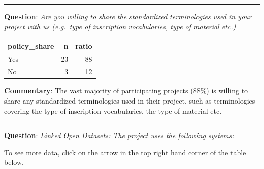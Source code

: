 \documentclass[
  12pt,
]{scrreprt}
\begin{document}
\begin{center}\rule{0.5\linewidth}{0.5pt}\end{center}

\textbf{Question}: \emph{Are you willing to share the standardized
terminologies used in your project with us (e.g.~type of inscription
vocabularies, type of material etc.)}

\begin{longtable}[]{@{}lrr@{}}
\toprule
policy\_share & n & ratio \\
\midrule
\endhead
Yes & 23 & 88 \\
No & 3 & 12 \\
\bottomrule
\end{longtable}

\textbf{Commentary}: The vast majority of participating projects (88\%)
is willing to share any standardized terminologies used in their
project, such as terminologies covering the type of inscription
vocabularies, the type of material etc.

\begin{center}\rule{0.5\linewidth}{0.5pt}\end{center}

\textbf{Question}: \emph{Linked Open Datasets: The project uses the
following systems:}

To see more data, click on the arrow in the top right hand corner of the
table below.
\end{document}
